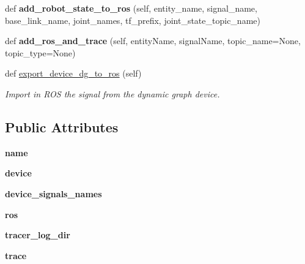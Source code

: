 \begin{DoxyCompactItemize}
\item 
def {\bfseries add\+\_\+robot\+\_\+state\+\_\+to\+\_\+ros} (self, entity\+\_\+name, signal\+\_\+name, base\+\_\+link\+\_\+name, joint\+\_\+names, tf\+\_\+prefix, joint\+\_\+state\+\_\+topic\+\_\+name)\hypertarget{classrobot_1_1Robot_a6c8b057c894e762bb43ceb7ec3e7db35}{}\label{classrobot_1_1Robot_a6c8b057c894e762bb43ceb7ec3e7db35}

\item 
def {\bfseries add\+\_\+ros\+\_\+and\+\_\+trace} (self, entity\+Name, signal\+Name, topic\+\_\+name=None, topic\+\_\+type=None)\hypertarget{classrobot_1_1Robot_a737de35c18b3bf050dc477da3a841970}{}\label{classrobot_1_1Robot_a737de35c18b3bf050dc477da3a841970}

\item 
def \hyperlink{classrobot_1_1Robot_ad5787c862823008387c047da5f34dd7e}{export\+\_\+device\+\_\+dg\+\_\+to\+\_\+ros} (self)\hypertarget{classrobot_1_1Robot_ad5787c862823008387c047da5f34dd7e}{}\label{classrobot_1_1Robot_ad5787c862823008387c047da5f34dd7e}

\begin{DoxyCompactList}\small\item\em Import in R\+OS the signal from the dynamic graph device. \end{DoxyCompactList}\end{DoxyCompactItemize}
\subsection*{Public Attributes}
\begin{DoxyCompactItemize}
\item 
{\bfseries name}\hypertarget{classrobot_1_1Robot_a24273c64e4c3266dd075ead7cd570c58}{}\label{classrobot_1_1Robot_a24273c64e4c3266dd075ead7cd570c58}

\item 
{\bfseries device}\hypertarget{classrobot_1_1Robot_ae90b19f45d0f60f5a9bcae2b96214ce7}{}\label{classrobot_1_1Robot_ae90b19f45d0f60f5a9bcae2b96214ce7}

\item 
{\bfseries device\+\_\+signals\+\_\+names}\hypertarget{classrobot_1_1Robot_a76c94351e17cf2da6a47f594db60bb14}{}\label{classrobot_1_1Robot_a76c94351e17cf2da6a47f594db60bb14}

\item 
{\bfseries ros}\hypertarget{classrobot_1_1Robot_aa64d4907ff7bc8916ab94993e36e8e92}{}\label{classrobot_1_1Robot_aa64d4907ff7bc8916ab94993e36e8e92}

\item 
{\bfseries tracer\+\_\+log\+\_\+dir}\hypertarget{classrobot_1_1Robot_a64ffbcaa3fa142fc15fb928f0a171609}{}\label{classrobot_1_1Robot_a64ffbcaa3fa142fc15fb928f0a171609}

\item 
{\bfseries trace}\hypertarget{classrobot_1_1Robot_aafc575f3ec8bd5a21277cca9645df962}{}\label{classrobot_1_1Robot_aafc575f3ec8bd5a21277cca9645df962}

\end{DoxyCompactItemize}
